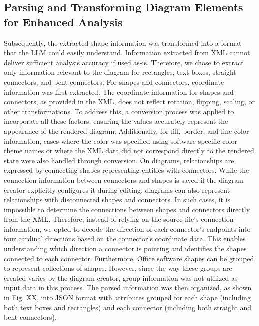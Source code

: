 \subsection{Parsing and Transforming Diagram Elements for Enhanced Analysis}
Subsequently, the extracted shape information was transformed into a format that the LLM could easily understand. 
Information extracted from XML cannot deliver sufficient analysis accuracy if used as-is. Therefore, we chose to extract only information relevant to the diagram for rectangles, text boxes, straight connectors, and bent connectors.
For shapes and connectors, coordinate information was first extracted. The coordinate information for shapes and connectors, as provided in the XML, does not reflect rotation, flipping, scaling, or other transformations. To address this, a conversion process was applied to incorporate all these factors, ensuring the values accurately represent the appearance of the rendered diagram.
Additionally, for fill, border, and line color information, cases where the color was specified using software-specific color theme names or where the XML data did not correspond directly to the rendered state were also handled through conversion.
On diagrams, relationships are expressed by connecting shapes representing entities with connectors. While the connection information between connectors and shapes is saved if the diagram creator explicitly configures it during editing, diagrams can also represent relationships with disconnected shapes and connectors. In such cases, it is impossible to determine the connections between shapes and connectors directly from the XML. Therefore, instead of relying on the source file's connection information, we opted to decode the direction of each connector's endpoints into four cardinal directions based on the connector's coordinate data. This enables understanding which direction a connector is pointing and identifies the shapes connected to each connector.
Furthermore, Office software shapes can be grouped to represent collections of shapes. However, since the way these groups are created varies by the diagram creator, group information was not utilized as input data in this process.
The parsed information was then organized, as shown in Fig. XX, into JSON format with attributes grouped for each shape (including both text boxes and rectangles) and each connector (including both straight and bent connectors).
